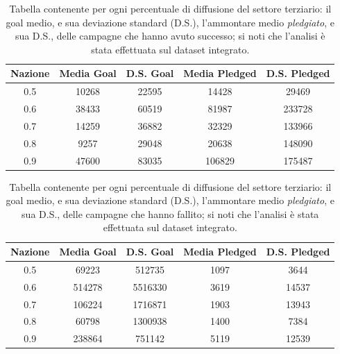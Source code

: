 \begin{table}
	\caption{Tabella contenente per ogni percentuale di diffusione del settore terziario: il goal medio, e sua deviazione standard (D.S.), l'ammontare medio \textit{pledgiato}, e sua D.S., delle campagne che hanno avuto successo; si noti che l'analisi è stata effettuata sul dataset integrato.}
	
	\label{tab:succ_mean_sd}
	
	\centering
	\begin{tabular}{|c|c|c|c|c|}
		\hline
		\textbf{Nazione} & \textbf{Media Goal} & \textbf{D.S. Goal} & \textbf{Media Pledged} & \textbf{D.S. Pledged} \\ \hline
		0.5&10268&22595&14428&29469 \\ \hline
		0.6&38433&60519&81987&233728
\\ \hline
		0.7&14259&36882&32329&133966
\\ \hline
		0.8&9257&29048&20638&148090
\\ \hline
		0.9&47600&83035&106829&175487 \\ \hline
	\end{tabular}
\end{table}

\begin{table}
	\caption{Tabella contenente per ogni percentuale di diffusione del settore terziario: il goal medio, e sua deviazione standard (D.S.), l'ammontare medio \textit{pledgiato}, e sua D.S., delle campagne che hanno fallito; si noti che l'analisi è stata effettuata sul dataset integrato.}
	
	\label{tab:fail_mean_sd}
	
	\centering
	\begin{tabular}{|c|c|c|c|c|}
		\hline
		\textbf{Nazione} & \textbf{Media Goal} & \textbf{D.S. Goal} & \textbf{Media Pledged} & \textbf{D.S. Pledged} \\ \hline
		0.5&69223&512735&1097&3644 \\ \hline
		0.6&514278&5516330&3619&14537 \\ \hline
		0.7&106224&1716871&1903&13943
\\ \hline
		0.8&60798&1300938&1400&7384
\\ \hline
		0.9&238864&751142&5119&12539 \\ \hline
	\end{tabular}
\end{table}